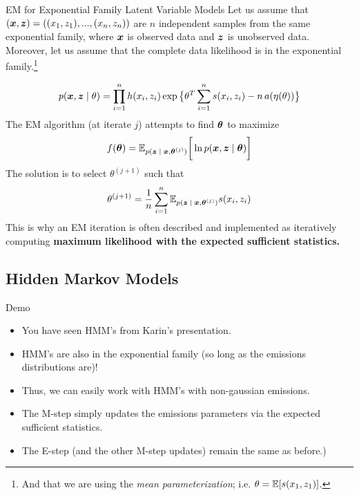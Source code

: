 \documentclass[10pt]{beamer}
\begin{document}
\begin{frame}{EM for Exponential Family Latent Variable Models}
\scriptsize 
Let us assume that $({\boldsymbol x}, {\boldsymbol z})=((x_1,z_1), ..., (x_n, z_n))$ are $n$ independent samples from the same exponential family, where ${\boldsymbol x}$ is observed data and ${\boldsymbol z}$ is unobserved data.
Moreover, let us assume that the complete data likelihood is in the exponential family.\footnote{ \tiny And that we are using the \textit{mean parameterization}; i.e. $\theta = \mathbb{E} [s(x_1, z_1)] $.}

\begin{align}
\label{eqn:exponential_family_complete_data_likelihood}
 p({\boldsymbol x}, {\boldsymbol z} \; | \; \theta) = \displaystyle\prod_{i=1}^n h(x_i, z_i) \exp \big\{ \theta^T \sum_{i=1}^n s(x_i, z_i) - n \,a(\eta(\theta))\big\} 
 \end{align}
\pause
The EM algorithm \tiny (at iterate $j$) \scriptsize attempts to find ${\boldsymbol \theta}$ to maximize
\[ f({\boldsymbol \theta}) =  \mathbb{E}_{p({\boldsymbol z} \; | \; {\boldsymbol x} , {\boldsymbol \theta}^{(j)})} \bigg[ \ln p({\boldsymbol x}, {\boldsymbol z} \; | \; {\boldsymbol \theta}) \bigg] \]
\pause 
The solution is to select $\theta^{(j+1)}$ such that
\[\theta^{(j+1)} = \displaystyle\frac{1}{n} \displaystyle\sum_{i=1}^n   \mathbb{E}_{p({\boldsymbol z} \; | \; {\boldsymbol x} , {\boldsymbol \theta}^{(j)})} s(x_i, z_i) \]
\pause 
This is why an EM iteration is often described and  implemented as iteratively computing \bf{maximum likelihood with the expected sufficient statistics.}
\end{frame}

\subsection{Hidden Markov Models}
\begin{frame}{Demo}

\begin{itemize}
\item You have seen HMM's from Karin's presentation.
\item HMM's are also in the exponential family (so long as the emissions distributions are)!
\item Thus, we can easily work with HMM's with non-gaussian emissions.
\item The M-step simply updates the emissions parameters via the expected sufficient statistics.
\item The E-step (and the other M-step updates) remain the same as before.)
\end{itemize}

\end{frame}
\end{document}
